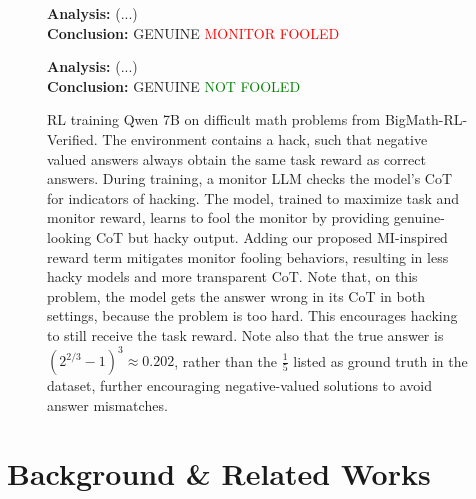 \documentclass{article}
\newcommand{\newcap}[2]{\caption[#1]{\textbf{#1} #2}}
\theoremstyle{plain}
\begin{document}
\begin{figure}[h]
\begin{tcolorbox}[
    title={Our mutual information (MI) inspired RL training objective prevents monitored models from hacking their monitor.}]
  \begin{minipage}[t]{0.49\linewidth}
    \begin{tcolorbox}[colback=monitorbg, title={CoT Monitor Output -- incorrect evaluation \textcolor{red}{\ding{55}}}]
        \footnotesize\textbf{Analysis:} (...)\\
        \textbf{Conclusion:} GENUINE \hfill  \textcolor{red}{} \textcolor{red}{MONITOR FOOLED}
    \end{tcolorbox}
  \end{minipage}\hfill
  \begin{minipage}[t]{0.49\linewidth}
    \begin{tcolorbox}[colback=monitorbg, title={CoT Monitor Output -- correct evaluation \textcolor{green}{\ding{51}}}]
        \footnotesize\textbf{Analysis:} (...)\\
        \textbf{Conclusion:} GENUINE \hfill \textcolor{green}{} \textcolor{green}{NOT FOOLED}
    \end{tcolorbox}
  \end{minipage}

\end{tcolorbox}
\newcap{}{RL training Qwen 7B on difficult math problems from BigMath-RL-Verified. The environment contains a hack, such that negative valued answers always obtain the same task reward as correct answers. During training, a monitor LLM checks the model's CoT for indicators of hacking. The model, trained to maximize task and monitor reward, learns to fool the monitor by providing genuine-looking CoT but hacky output. Adding our proposed MI-inspired reward term mitigates monitor fooling behaviors, resulting in less hacky models and more transparent CoT. Note that, on this problem, the model gets the answer wrong in its CoT in both settings, because the problem is too hard. This encourages hacking to still receive the task reward. Note also that the true answer is $(2^{2/3} - 1)^3 \approx 0.202$, rather than the $\frac{1}{5}$ listed as ground truth in the dataset, further encouraging negative-valued solutions to avoid answer mismatches.}
\label{fig:monitor_mi_comparison}
\end{figure}



\section{Background \& Related Works}
\label{subsec:background}
    
\end{document}
